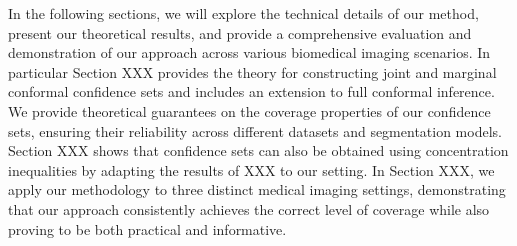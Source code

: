 In the following sections, we will explore the technical details of our method, present our theoretical results, and provide a comprehensive evaluation and demonstration of our approach across various biomedical imaging scenarios. In particular Section XXX provides the theory for constructing joint and marginal conformal confidence sets and includes an extension to full conformal inference. We provide theoretical guarantees on the coverage properties of our confidence sets, ensuring their reliability across different datasets and segmentation models. Section XXX shows that confidence sets can also be obtained using concentration inequalities by adapting the results of XXX to our setting. In Section XXX, we apply our methodology to three distinct medical imaging settings, demonstrating that our approach consistently achieves the correct level of coverage while also proving to be both practical and informative.
  
